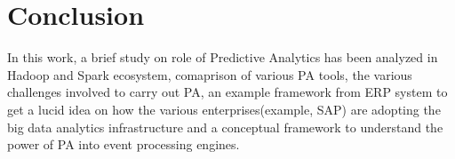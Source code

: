 \documentclass[runningheads]{llncs}
\begin{document}
\section{Conclusion} In this work, a brief study on role of Predictive Analytics has been analyzed in Hadoop and Spark ecosystem, comaprison of various PA tools, the various challenges involved to carry out PA, an example framework from ERP system to get a lucid idea on how the various enterprises(example, SAP) are adopting the big data analytics infrastructure and a conceptual framework to understand the power of PA into event processing engines. 



\end{document}
